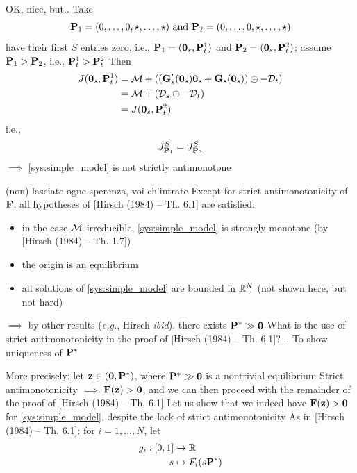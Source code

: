 \documentclass[aspectratio=169]{beamer}
\begin{document}
\begin{frame}{OK, nice, but..}
	Take
	\[
	\mathbf{P}_1 = (0,\ldots,0,\star,\ldots,\star) \textrm{ and }
	\mathbf{P}_2 = (0,\ldots,0,\star,\ldots,\star)
	\]
	have their first $S$ entries zero, i.e., $\bP_1=(\b0_s,\bP_t^1)$ and $\bP_2=(\b0_s,\bP_t^2)$; assume $\mathbf{P}_1>\mathbf{P}_2$, i.e., $\mathbf{P}_t^1>\mathbf{P}_t^2$
	\vfill
	Then
	\begin{align*}
	J(\b0_s,\bP_t^1) &= \M+ \left((\bG_s'(\b0_s)\b0_s+\bG_s(\b0_s))\oplus -\D_t\right) \\
	&= \M+\left(\D_s\oplus -\D_t\right) \\
	&= J(\b0_s,\bP_t^2)
	\end{align*}
	i.e.,
	\[
	J^S_{\mathbf{P}_1}=J^S_{\mathbf{P}_2}
	\]
	\vfill
	$\implies$ \eqref{sys:simple_model} is not strictly antimonotone
\end{frame}


\begin{frame}{(non) lasciate ogne sperenza, voi ch'intrate}
	Except for strict antimonotonicity of $\mathbf{F}$, all hypotheses of [Hirsch (1984) -- Th. 6.1] are satisfied:
	\begin{itemize}
		\item in the case $\mathcal{M}$ irreducible, \eqref{sys:simple_model} is strongly monotone (by [Hirsch (1984) -- Th. 1.7])
		\item the origin is an equilibrium
		\item all solutions of \eqref{sys:simple_model} are bounded in $\mathbb{R}_+^N$ (not shown here, but not hard)
	\end{itemize}
	\vfill
	$\implies$ by other results (\emph{e.g.}, Hirsch \emph{ibid}), there exists $\bP^*\gg \b0$
	\vfill
	What is the use of strict antimonotonicity in the proof of [Hirsch (1984) -- Th. 6.1]? .. To show uniqueness of $\mathbf{P}^*$
\end{frame}

\begin{frame}
		More precisely: let $\bz\in(\b0,\bP^*)$, where $\bP^*\gg\b0$ is a nontrivial equilibrium
		\vfill
		Strict antimonotonicity $\implies$ $\bF(\bz)>\b0$, and we can then proceed with the remainder of the proof of [Hirsch (1984) -- Th. 6.1]
		\vfill
		Let us show that we indeed have $\bF(\bz)>\b0$ for \eqref{sys:simple_model}, despite the lack of strict antimonotonicity
		\vfill
		As in [Hirsch (1984) -- Th. 6.1]: for $i = 1,\ldots,N$, let 
		\begin{align*}
		g_i :  [0,1] &\to\mathbb{R} \\
		s &\mapsto F_i(s\mathbf{P}^*)
		\end{align*}
\end{frame}
\end{document}
